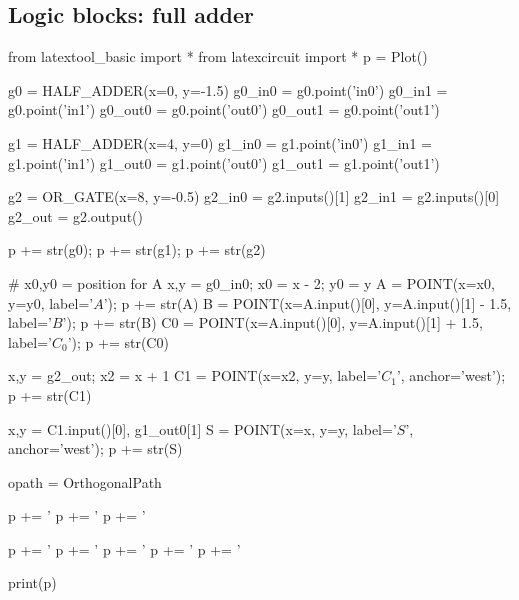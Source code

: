 \subsection{Logic blocks: full adder}
\begin{python}
from latextool_basic import *
from latexcircuit import *
p = Plot()

g0 = HALF_ADDER(x=0, y=-1.5)
g0_in0 = g0.point('in0')
g0_in1 = g0.point('in1')
g0_out0 = g0.point('out0')
g0_out1 = g0.point('out1')

g1 = HALF_ADDER(x=4, y=0)
g1_in0 = g1.point('in0')
g1_in1 = g1.point('in1')
g1_out0 = g1.point('out0')
g1_out1 = g1.point('out1')

g2 = OR_GATE(x=8, y=-0.5)
g2_in0 = g2.inputs()[1]
g2_in1 = g2.inputs()[0]
g2_out = g2.output()

p += str(g0); p += str(g1); p += str(g2)

# x0,y0 = position for A 
x,y = g0_in0; x0 = x - 2; y0 = y
A = POINT(x=x0, y=y0, label='$A$'); p += str(A)
B = POINT(x=A.input()[0], y=A.input()[1] - 1.5, label='$B$'); p += str(B)
C0 = POINT(x=A.input()[0], y=A.input()[1] + 1.5, label='$C_0$'); p += str(C0)

x,y = g2_out; x2 = x + 1
C1 = POINT(x=x2, y=y, label='$C_1$', anchor='west'); p += str(C1)

x,y = C1.input()[0], g1_out0[1]
S = POINT(x=x, y=y, label='$S$', anchor='west'); p += str(S)

opath = OrthogonalPath

p += '%
p += '%
p += '%

p += '%
p += '%
p += '%
p += '%
p += '%

print(p)
\end{python}




